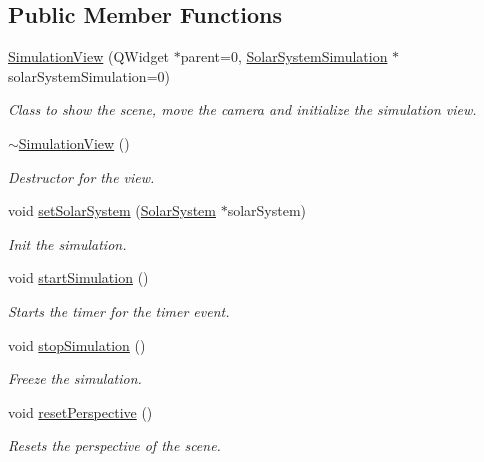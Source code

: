 \subsection*{\-Public \-Member \-Functions}
\begin{DoxyCompactItemize}
\item 
\hyperlink{classSimulationView_a4d55de963f5612a2c894f501a8928991}{\-Simulation\-View} (\-Q\-Widget $\ast$parent=0, \hyperlink{classSolarSystemSimulation}{\-Solar\-System\-Simulation} $\ast$solar\-System\-Simulation=0)
\begin{DoxyCompactList}\small\item\em \-Class to show the scene, move the camera and initialize the simulation view. \end{DoxyCompactList}\item 
\hyperlink{classSimulationView_a7ccb9a29e3632431bba5a686da61d8a9}{$\sim$\-Simulation\-View} ()
\begin{DoxyCompactList}\small\item\em \-Destructor for the view. \end{DoxyCompactList}\item 
void \hyperlink{classSimulationView_ad1e431046ff2a7e774d92bbba6fded3b}{set\-Solar\-System} (\hyperlink{classSolarSystem}{\-Solar\-System} $\ast$solar\-System)
\begin{DoxyCompactList}\small\item\em \-Init the simulation. \end{DoxyCompactList}\item 
void \hyperlink{classSimulationView_ae7936c84b92f7ae64a772a9ba1422624}{start\-Simulation} ()
\begin{DoxyCompactList}\small\item\em \-Starts the timer for the timer event. \end{DoxyCompactList}\item 
void \hyperlink{classSimulationView_ad51d8480373e82c73e3353c868df6f87}{stop\-Simulation} ()
\begin{DoxyCompactList}\small\item\em \-Freeze the simulation. \end{DoxyCompactList}\item 
void \hyperlink{classSimulationView_acde2b2fb1ac01e85a8f8efbbe6717f12}{reset\-Perspective} ()
\begin{DoxyCompactList}\small\item\em \-Resets the perspective of the scene. \end{DoxyCompactList}\item 

\end{DoxyCompactItemize}
